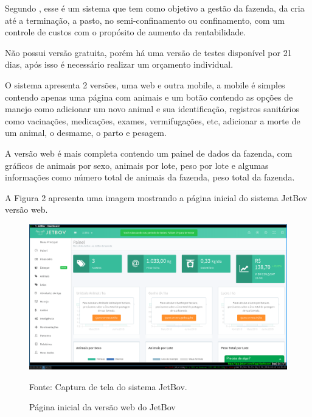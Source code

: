 Segundo , esse é um sistema que tem como objetivo a gestão da fazenda, da cria até a terminação, a pasto, no semi-confinamento ou confinamento, com um controle de custos com o propósito de aumento da rentabilidade.

Não possui versão gratuita, porém há uma versão de testes disponível por 21 dias, após isso é necessário realizar um orçamento individual.

O sistema apresenta 2 versões, uma web e outra mobile, a mobile é simples contendo apenas uma página com animais e um botão contendo as opções de manejo como adicionar um novo animal e sua identificação, registros sanitários como vacinações, medicações, exames, vermifugações, etc, adicionar a morte de um animal, o desmame, o parto e pesagem.

A versão web é mais completa contendo um painel de dados da fazenda, com gráficos de animais por sexo, animais por lote, peso por lote e algumas informações como número total de animais da fazenda, peso total da fazenda.

A Figura 2 apresenta uma imagem mostrando a página inicial do sistema JetBov versão web.

\begin{figure}[H]
	\begin{center}
		\caption{Página inicial da versão web do JetBov}
		\includegraphics[width=\textwidth]{../img/jetbov.png}

		Fonte: Captura de tela do sistema JetBov.
	\end{center}
\end{figure}


